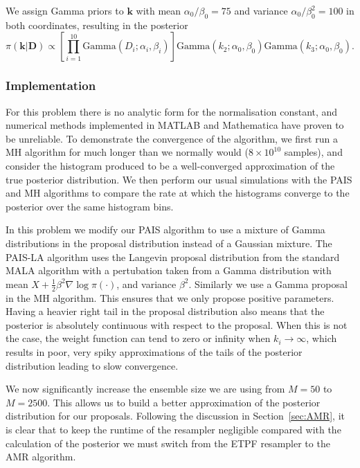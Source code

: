 \documentclass[final]{siamltex}
\begin{document}
We assign Gamma priors to $\mathbf{k}$ with mean $\alpha_0/\beta_0 =
75$ and variance $\alpha_0/\beta_0^2 = 100$ in both coordinates, resulting in the posterior
\[
	\pi(\mathbf{k}|\mathbf{D}) \propto \left[\prod\limits_{i=1}^{10} \text{Gamma}(D_i; \alpha_i, \beta_i)\right]\text{Gamma}(k_2; \alpha_0, \beta_0)\text{Gamma}(k_3; \alpha_0, \beta_0).
\]

\subsubsection{Implementation}\label{sec:chem_implementation}
For this problem there is no analytic form for the normalisation
constant, and numerical methods implemented in MATLAB and Mathematica
have proven to be unreliable. To demonstrate the convergence of the
algorithm, we first run a MH algorithm for much longer than we
normally would ($8\times 10^{10}$ samples), and consider the histogram
produced to be a well-converged approximation of the true posterior
distribution. We then perform our usual simulations with the PAIS and
MH algorithms to compare the rate at which the histograms converge to
the posterior over the same histogram bins.

In this problem we modify our PAIS algorithm to use a mixture of Gamma
distributions in the proposal distribution instead of a Gaussian
mixture. The PAIS-LA algorithm uses the Langevin proposal distribution
from the standard MALA algorithm with a pertubation taken from a Gamma
distribution with mean $X+\frac{1}{2}\beta^2\nabla \log\pi(\cdot)$,
and  variance $\beta^2$. Similarly we use a Gamma proposal in the MH
algorithm. This ensures that we only propose positive
parameters. Having a heavier right tail in the proposal distribution
also means that the posterior is absolutely continuous with respect to
the proposal. When this is not the case, the weight function can tend
to zero or infinity when $k_i \rightarrow \infty$, which results in
poor, very spiky approximations of the tails of the posterior distribution leading to slow convergence.

We now significantly increase the ensemble size we are using from $M=50$ to $M=2500$. This allows us to build a better approximation of the posterior distribution for our proposals. Following the discussion in Section~\ref{sec:AMR}, it is clear that to keep the runtime of the resampler negligible compared with the calculation of the posterior we must switch from the ETPF resampler to the AMR algorithm.
\end{document}
